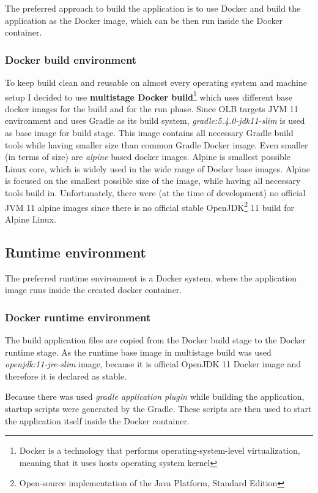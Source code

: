 The preferred approach to build the application is to use Docker
and build the application as the Docker image, 
which can be then run inside the Docker container.

\subsubsection{Docker build environment}
To keep build clean and reusable on almost every operating system and 
machine setup I decided to use 
\textbf{multistage Docker build}\footnote{Docker is a technology that performs operating-system-level virtualization,
meaning that it uses hosts operating system kernel}
which uses different base docker images for the build and for the run phase.
Since OLB targets JVM 11 environment and uses Gradle as its build system,
\textit{gradle:5.4.0-jdk11-slim} is used as base image for build stage.
This image contains all necessary Gradle build tools while having smaller size than common Gradle Docker image.
Even smaller (in terms of size) are \textit{alpine} based docker images. 
Alpine is smallest possible Linux core, 
which is widely used in the wide range of Docker base images.
Alpine is focused on the smallest possible size of the image, 
while having all necessary tools build in.
Unfortunately, there were (at the time of development) no official JVM 11 alpine images
since there is no official stable OpenJDK\footnote{Open-source implementation of the Java Platform, Standard Edition} 
11 build for Alpine Linux.

\subsection{Runtime environment}
The preferred runtime environment is a Docker system, 
where the application image runs inside the created docker container.

\subsubsection{Docker runtime environment}\label{subsubsec:docker-runtime-env}
The build application files are copied from the Docker build stage to the Docker runtime stage.
As the runtime base image in multistage build was used \textit{openjdk:11-jre-slim} image,
because it is official OpenJDK 11 Docker image and therefore it is declared as stable.

Because there was used \textit{gradle application plugin} while building the application, 
startup scripts were generated by the Gradle.
These scripts are then used to start the application itself inside the Docker container.

